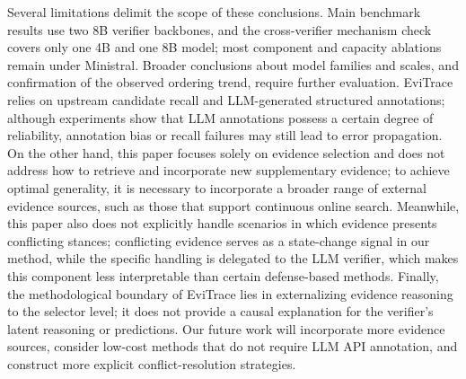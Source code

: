 \documentclass[letterpaper]{article}
\begin{document}
Several limitations delimit the scope of these conclusions. Main benchmark results use two 8B verifier backbones, and the cross-verifier mechanism check covers only one 4B and one 8B model; most component and capacity ablations remain under Ministral. Broader conclusions about model families and scales, and confirmation of the observed ordering trend, require further evaluation. EviTrace relies on upstream candidate recall and LLM-generated structured annotations; although experiments show that LLM annotations possess a certain degree of reliability, annotation bias or recall failures may still lead to error propagation. On the other hand, this paper focuses solely on evidence selection and does not address how to retrieve and incorporate new supplementary evidence; to achieve optimal generality, it is necessary to incorporate a broader range of external evidence sources, such as those that support continuous online search. Meanwhile, this paper also does not explicitly handle scenarios in which evidence presents conflicting stances; conflicting evidence serves as a state-change signal in our method, while the specific handling is delegated to the LLM verifier, which makes this component less interpretable than certain defense-based methods. Finally, the methodological boundary of EviTrace lies in externalizing evidence reasoning to the selector level; it does not provide a causal explanation for the verifier's latent reasoning or predictions. Our future work will incorporate more evidence sources, consider low-cost methods that do not require LLM API annotation, and construct more explicit conflict-resolution strategies.


\end{document}
